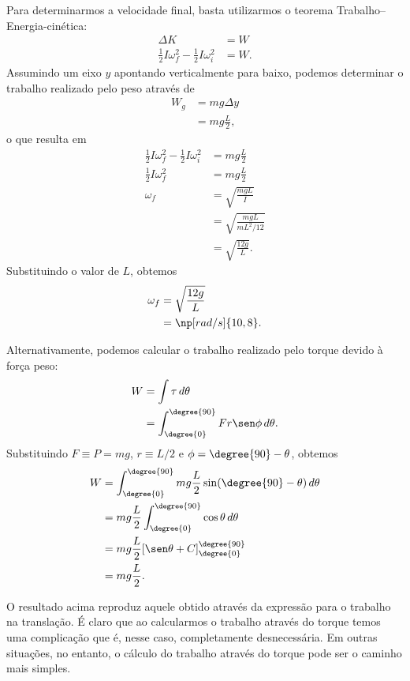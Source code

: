 Para determinarmos a velocidade final, basta utilizarmos o teorema Trabalho--Energia-cinética:
\begin{align}
    \Delta K & = W \\
    \frac{1}{2} I \omega_f^2 - \frac{1}{2} I \omega_i^2 &= W.
\end{align}
%
Assumindo um eixo $y$ apontando verticalmente para baixo, podemos determinar o trabalho realizado pelo peso através de 
\begin{align}
    W_g &= mg\Delta y \\
    &= mg\frac{L}{2},
\end{align}
%
o que resulta em
\begin{align}
     \frac{1}{2} I \omega_f^2 - \frac{1}{2} I \omega_i^2 &= mg\frac{L}{2} \\
      \frac{1}{2} I \omega_f^2 &= mg\frac{L}{2} \\
      \omega_f &= \sqrt{\frac{mgL}{I}} \\
      &= \sqrt{\frac{mgL}{mL^2/12}} \\
      &= \sqrt{\frac{12g}{L}}.
\end{align}
%
Substituindo o valor de $L$, obtemos
\begin{align}
    \omega_f &= \sqrt{\frac{12g}{L}} \\
    &= \np[rad/s]{10,8}.
\end{align}

Alternativamente, podemos calcular o trabalho realizado pelo torque devido à força peso:
\begin{align}
    W &= \int \tau \,d\theta \\
    &= \int_{\degree{0}}^{\degree{90}} F r \sen\phi \,d\theta.
\end{align}
%
Substituindo $F \equiv P = mg$, $r \equiv L/2$ e $\phi = \degree{90} - \theta$, obtemos
\begin{align}
    W &= \int_{\degree{0}}^{\degree{90}} mg\frac{L}{2} \sin(\degree{90} - \theta)\,d\theta \\
    &= mg\frac{L}{2} \int_{\degree{0}}^{\degree{90}} \cos \theta \,d\theta \\
    &= mg\frac{L}{2} [\sen \theta + C]_{\degree{0}}^{\degree{90}} \\
    &= mg\frac{L}{2}.
\end{align}

O resultado acima reproduz aquele obtido através da expressão para o trabalho na translação. É claro que ao calcularmos o trabalho através do torque temos uma complicação que é, nesse caso, completamente desnecessária. Em outras situações, no entanto, o cálculo do trabalho através do torque pode ser o caminho mais simples.


